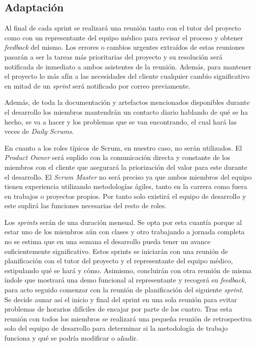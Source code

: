      \subsection{Adaptación}
    Al final de cada sprint se realizará una reunión tanto con el tutor del proyecto como con un representante del equipo médico para revisar el proceso y obtener \textit{feedback} del mismo. Los errores o cambios urgentes extraídos de estas reuniones pasarán a ser la tareas más prioritarias del proyecto y su resolución será notificada de inmediato a ambos asistentes de la reunión. Además, para mantener el proyecto lo más afín a las necesidades del cliente cualquier cambio significativo en mitad de un \textit{sprint} será notificado por correo previamente.
    \newline
    
    Además, de toda la documentación y artefactos mencionados disponibles durante el desarrollo los miembros mantendrán un contacto diario hablando de qué se ha hecho, se va a hacer y los problemas que se van encontrando, el cual hará las veces de \textit{Daily Scrums}.\newline

	En cuanto a los roles típicos de Scrum, en nuestro caso, no serán utilizados. El \textit{Product Owner} será suplido con la comunicación directa y constante  de los miembros con el cliente que asegurará la priorización del valor para este durante el desarrollo. El \textit{Scrum Master} no será preciso ya que ambos miembros del equipo tienen experiencia utilizando metodologías ágiles, tanto en la carrera como fuera en trabajos o proyectos propios. Por tanto solo existirá el equipo de desarrollo y este suplirá las funciones necesarias del resto de roles.\newline

	Los \textit{sprints} serán de una duración mensual. Se opta por esta cuantía porque al estar uno de los miembros aún con clases y otro trabajando a jornada completa no se estima que en una semana el desarrollo pueda tener un avance suficientemente significativo. Estos sprints se iniciarán con una reunión de planificación con el tutor del proyecto y el representante del equipo médico, estipulando qué se hará y cómo. Asimismo, concluirán con otra reunión de misma índole que mostrará una demo funcional al representante y recogerá su \textit{feedback}, para acto seguido comenzar con la reunión de planificación del siguiente \textit{sprint}. Se decide aunar así el inicio y final del sprint en una sola reunión para evitar problemas de horarios difíciles de encajar por parte de los cuatro. Tras esta reunión con todos los miembros se realizará una pequeña reunión de retrospectiva solo del equipo de desarrollo para determinar si la metodología de trabajo funciona y qué se podría modificar o añadir.\newline


